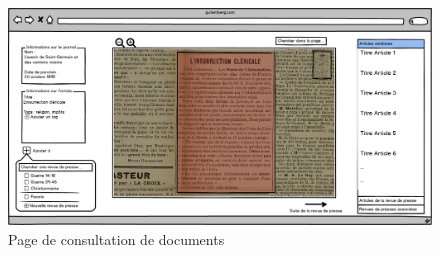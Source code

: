     \begin{figure}[H]
        \centering
        \includegraphics[width=\textwidth]{figures/consultation.png}
            \caption{Page de consultation de documents}
            \label{fig:consultation}
    \end{figure}